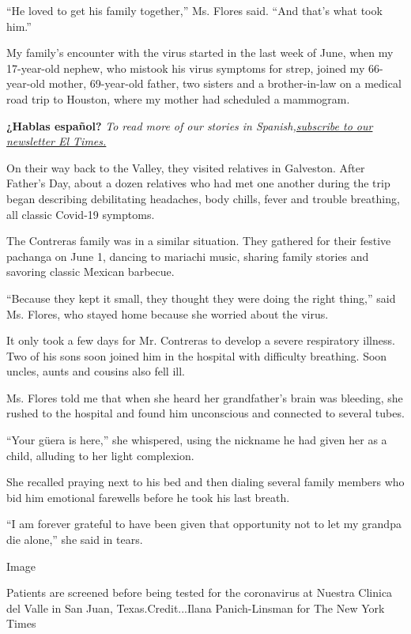 ``He loved to get his family together,'' Ms. Flores said. ``And that's
what took him.''

My family's encounter with the virus started in the last week of June,
when my 17-year-old nephew, who mistook his virus symptoms for strep,
joined my 66-year-old mother, 69-year-old father, two sisters and a
brother-in-law on a medical road trip to Houston, where my mother had
scheduled a mammogram.

\textbf{¿Hablas español?} \emph{To read more of our stories in
Spanish,}\href{https://www.nytimes.com/newsletters/el-times}{\emph{subscribe
to our newsletter El Times.}}

On their way back to the Valley, they visited relatives in Galveston.
After Father's Day, about a dozen relatives who had met one another
during the trip began describing debilitating headaches, body chills,
fever and trouble breathing, all classic Covid-19 symptoms.

The Contreras family was in a similar situation. They gathered for their
festive pachanga on June 1, dancing to mariachi music, sharing family
stories and savoring classic Mexican barbecue.

``Because they kept it small, they thought they were doing the right
thing,'' said Ms. Flores, who stayed home because she worried about the
virus.

It only took a few days for Mr. Contreras to develop a severe
respiratory illness. Two of his sons soon joined him in the hospital
with difficulty breathing. Soon uncles, aunts and cousins also fell ill.

Ms. Flores told me that when she heard her grandfather's brain was
bleeding, she rushed to the hospital and found him unconscious and
connected to several tubes.

``Your güera is here,'' she whispered, using the nickname he had given
her as a child, alluding to her light complexion.

She recalled praying next to his bed and then dialing several family
members who bid him emotional farewells before he took his last breath.

``I am forever grateful to have been given that opportunity not to let
my grandpa die alone,'' she said in tears.

Image

Patients are screened before being tested for the coronavirus at Nuestra
Clinica del Valle in San Juan, Texas.Credit...Ilana Panich-Linsman for
The New York Times

